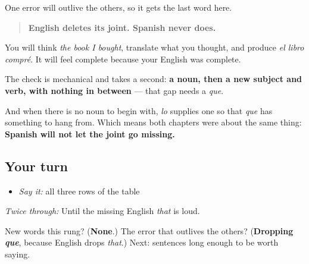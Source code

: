 \begin{grammarlens}[title={Grammar Lens: what to actually watch for}]
One error will outlive the others, so it gets the last word here.

\begin{quote}
\textbf{English deletes its joint. Spanish never does.}
\end{quote}

You will think \emph{the book I bought}, translate what you thought, and produce \emph{el libro compré}. It will feel complete because your English was complete.

The check is mechanical and takes a second: \textbf{a noun, then a new subject and verb, with nothing in between} — that gap needs a \emph{que}.

And when there is no noun to begin with, \emph{lo} supplies one so that \emph{que} has something to hang from. Which means both chapters were about the same thing: \textbf{Spanish will not let the joint go missing.}
\end{grammarlens}

\subsection*{Your turn}
\begin{itemize}
\raggedright
  \item \emph{Say it:} all three rows of the table
\end{itemize}

\emph{Twice through:} Until the missing English \emph{that} is loud.

\begin{tcolorbox}[breakable,colback=teal!4,colframe=teal!35!black,title={Before you move on}]
New words this rung? (\textbf{None}.) The error that outlives the others? (\textbf{Dropping \emph{que}}, because English drops \emph{that}.) Next: sentences long enough to be worth saying.
\end{tcolorbox}
